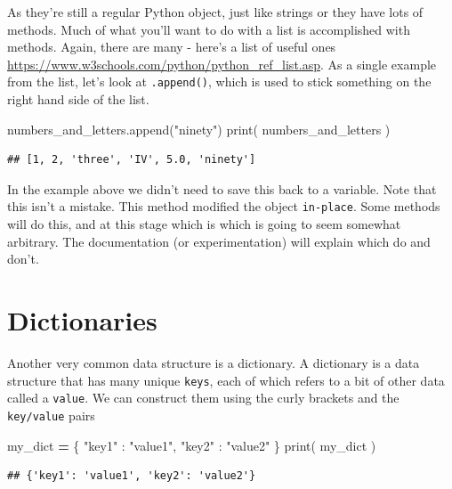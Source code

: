 \documentclass[]{book}
\newenvironment{Shaded}{\begin{snugshade}}{\end{snugshade}}
\newcommand{\BuiltInTok}[1]{#1}
\newcommand{\NormalTok}[1]{#1}
\newcommand{\OperatorTok}[1]{\textcolor[rgb]{0.81,0.36,0.00}{\textbf{#1}}}
\newcommand{\StringTok}[1]{\textcolor[rgb]{0.31,0.60,0.02}{#1}}
\theoremstyle{definition}
\theoremstyle{definition}
\theoremstyle{definition}
\theoremstyle{remark}
\let\BeginKnitrBlock\begin \let\EndKnitrBlock\end
\begin{document}
As they're still a regular Python object, just like strings or they have
lots of methods. Much of what you'll want to do with a list is
accomplished with methods. Again, there are many - here's a list of
useful ones \url{https://www.w3schools.com/python/python_ref_list.asp}.
As a single example from the list, let's look at \texttt{.append()},
which is used to stick something on the right hand side of the list.

\begin{Shaded}
\begin{Highlighting}[]
\NormalTok{numbers_and_letters.append(}\StringTok{"ninety"}\NormalTok{)}
\BuiltInTok{print}\NormalTok{( numbers_and_letters )}
\end{Highlighting}
\end{Shaded}

\begin{verbatim}
## [1, 2, 'three', 'IV', 5.0, 'ninety']
\end{verbatim}

\BeginKnitrBlock{reader}
In the example above we didn't need to save this back to a variable.
Note that this isn't a mistake. This method modified the object
\texttt{in-place}. Some methods will do this, and at this stage which is
which is going to seem somewhat arbitrary. The documentation (or
experimentation) will explain which do and don't.
\EndKnitrBlock{reader}

\hypertarget{dictionaries}{%
\section{Dictionaries}\label{dictionaries}}

Another very common data structure is a dictionary. A dictionary is a
data structure that has many unique \texttt{keys}, each of which refers
to a bit of other data called a \texttt{value}. We can construct them
using the curly brackets and the \texttt{key/value} pairs

\begin{Shaded}
\begin{Highlighting}[]
\NormalTok{my_dict }\OperatorTok{=}\NormalTok{ \{}
  \StringTok{"key1"}\NormalTok{ : }\StringTok{"value1"}\NormalTok{,}
  \StringTok{"key2"}\NormalTok{ : }\StringTok{"value2"}
\NormalTok{\}}
\BuiltInTok{print}\NormalTok{( my_dict )}
\end{Highlighting}
\end{Shaded}

\begin{verbatim}
## {'key1': 'value1', 'key2': 'value2'}
\end{verbatim}
\end{document}
